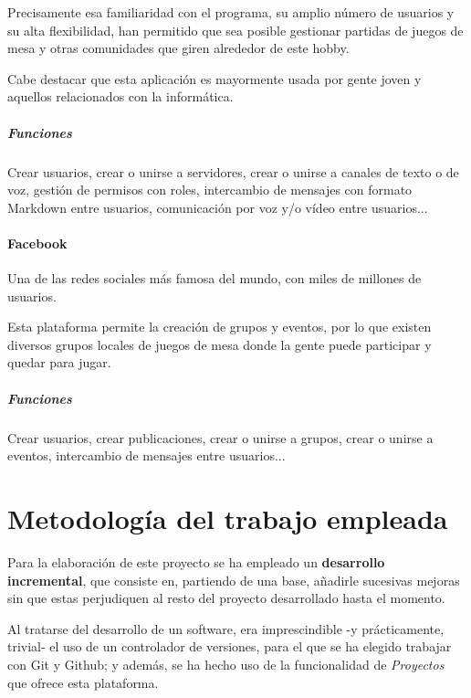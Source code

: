                 Precisamente esa familiaridad con el programa, su amplio número de usuarios y su alta flexibilidad, han permitido que sea posible gestionar partidas de juegos de mesa y otras comunidades que giren alrededor de este hobby.

                Cabe destacar que esta aplicación es mayormente usada por gente joven y aquellos relacionados con la informática.

                \subparagraph{Funciones}

                    Crear usuarios, crear o unirse a servidores, crear o unirse a canales de texto o de voz, gestión de permisos con roles, intercambio de mensajes con formato Markdown entre usuarios, comunicación por voz y/o vídeo entre usuarios...


            \paragraph{Facebook}

                Una de las redes sociales más famosa del mundo, con miles de millones de usuarios.

                Esta plataforma permite la creación de grupos y eventos, por lo que existen diversos grupos locales de juegos de mesa donde la gente puede participar y quedar para jugar.

                \subparagraph{Funciones}

                    Crear usuarios, crear publicaciones, crear o unirse a grupos, crear o unirse a eventos, intercambio de mensajes entre usuarios...

                    \newpage


    \section{Metodología del trabajo empleada}
    \label{intro:met}

        Para la elaboración de este proyecto se ha empleado un \textbf{desarrollo incremental}, que consiste en, partiendo de una base, añadirle sucesivas mejoras sin que estas perjudiquen al resto del proyecto desarrollado hasta el momento.


        Al tratarse del desarrollo de un software, era imprescindible -y prácticamente, trivial- el uso de un controlador de versiones, para el que se ha elegido trabajar con Git y Github; y además, se ha hecho uso de la funcionalidad de \textit{Proyectos} que ofrece esta plataforma.

